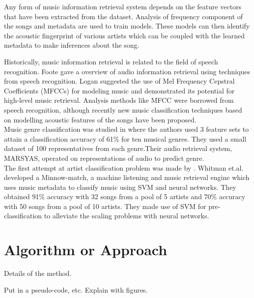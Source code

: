 \documentclass[twocolumn]{article}
\newcommand{\comment}[1]{}
\begin{document}
Any form of music information retrieval system depends on the feature vectors that have been extracted from the dataset. Analysis of frequency component of the songs and metadata are used to train models. These models can then identify the acoustic fingerprint of various artists which can be coupled with the learned metadata to make inferences about the song.

Historically, music information retrieval is related to the field of speech recognition. Foote \cite{Foote} gave a overview of audio information retrieval using techniques from speech recognition. Logan \cite{LOGAN} suggested the use of Mel Frequency Cepstral Coefficients (MFCCs) for modeling music and demonstrated its potential for high-level music retrieval. Analysis methods like MFCC were borrowed from speech recognition, although recently new music classification techniques based on modelling acoustic features of the songs have been proposed.\\
Music genre classification was studied in \cite{GTAN} where the authors used 3 feature sets to attain a classification accuracy of 61\% for ten musical genres. They used a small dataset of 100 representatives from each genre.Their audio retrieval system, MARSYAS, operated on representations of audio to predict genre.\\
The first attempt at artist classification problem was made by \cite{BGS}. Whitman et.al.\cite{BGS} developed a Minnow-match, a machine listening and music retrieval engine which uses music metadata to classify music using SVM and neural networks. They obtained 91\% accuracy with 32 songs from a pool of 5 artists and 70\% accuracy with 50 songs from a pool of 10 artists. They made use of SVM for pre-classification to alleviate the scaling problems with neural networks.
\comment{

Can also comment out paragraphs, etc.

}

\section{Algorithm or Approach}

Details of the method.

Put in a pseudo-code, etc.
Explain with figures.

\comment{

Use the following format for figures:

\begin{figure}[t]
	\centering
	\texttt{[image: figure\_file]}
	\caption{This figure explains this.}
	\label{fig:block}
\end{figure}

And refer as Figure \ref{fig:block}.

}
\end{document}
